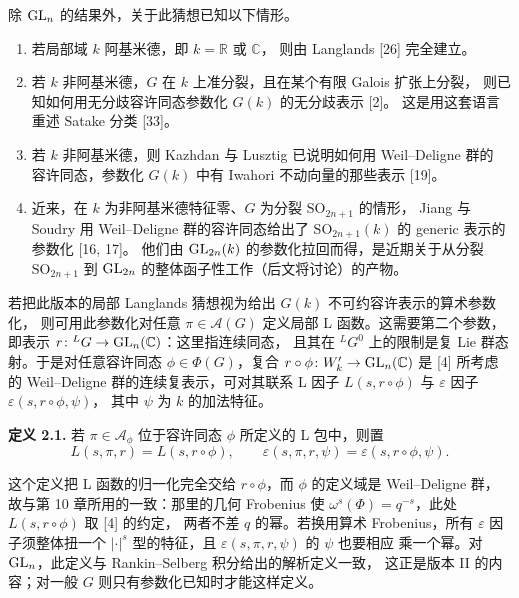 除 $\mathrm{GL}_n$ 的结果外，关于此猜想已知以下情形。
\begin{enumerate}[label=\arabic*.,leftmargin=*]
  \item 若局部域 $k$ 阿基米德，即 $k=\mathbb{R}$ 或 $\mathbb{C}$，
    则由 Langlands [26] 完全建立。
  \item 若 $k$ 非阿基米德，$G$ 在 $k$ 上准分裂，且在某个有限 Galois 扩张上分裂，
    则已知如何用无分歧容许同态参数化 $G(k)$ 的无分歧表示 [2]。
    这是用这套语言重述 Satake 分类 [33]。
  \item 若 $k$ 非阿基米德，则 Kazhdan 与 Lusztig 已说明如何用 Weil--Deligne 群的
    容许同态，参数化 $G(k)$ 中有 Iwahori 不动向量的那些表示 [19]。
  \item 近来，在 $k$ 为非阿基米德特征零、$G$ 为分裂 $\mathrm{SO}_{2n+1}$ 的情形，
    Jiang 与 Soudry 用 Weil--Deligne 群的容许同态给出了
    $\mathrm{SO}_{2n+1}(k)$ 的 generic 表示的参数化 [16, 17]。
    他们由 $\mathrm{GL}_{2n}(k)$ 的参数化拉回而得，是近期关于从分裂
    $\mathrm{SO}_{2n+1}$ 到 $\mathrm{GL}_{2n}$ 的整体函子性工作（后文将讨论）的产物。
\end{enumerate}
若把此版本的局部 Langlands 猜想视为给出 $G(k)$ 不可约容许表示的算术参数化，
则可用此参数化对任意 $\pi\in\mathcal{A}(G)$ 定义局部 L 函数。这需要第二个参数，
即表示 $r\colon{}^{L}G\to\mathrm{GL}_n(\mathbb{C})$：这里指连续同态，
且其在 ${}^{L}G^{0}$ 上的限制是复 Lie 群态射。于是对任意容许同态
$\phi\in\Phi(G)$，复合 $r\circ\phi\colon W'_k\to\mathrm{GL}_n(\mathbb{C})$
是 [4] 所考虑的 Weil--Deligne 群的连续复表示，可对其联系 L 因子
$L(s,r\circ\phi)$ 与 $\varepsilon$ 因子 $\varepsilon(s,r\circ\phi,\psi)$，
其中 $\psi$ 为 $k$ 的加法特征。

\par\medskip\noindent\textbf{定义 2.1.}\quad
若 $\pi\in\mathcal{A}_\phi$ 位于容许同态 $\phi$ 所定义的 L 包中，则置
\[
  L(s,\pi,r)=L(s,r\circ\phi),\qquad
  \varepsilon(s,\pi,r,\psi)=\varepsilon(s,r\circ\phi,\psi).
\]
\begin{annote}
这个定义把 L 函数的归一化完全交给 $r\circ\phi$，而 $\phi$ 的定义域是
Weil--Deligne 群，故与第 10 章所用的一致：那里的几何 Frobenius 使
$\omega^{s}(\Phi)=q^{-s}$，此处 $L(s,r\circ\phi)$ 取 [4] 的约定，
两者不差 $q$ 的幂。若换用算术 Frobenius，所有 $\varepsilon$ 因子须整体扭一个
$|\cdot|^{s}$ 型的特征，且 $\varepsilon(s,\pi,r,\psi)$ 的 $\psi$ 也要相应
乘一个幂。对 $\mathrm{GL}_n$，此定义与 Rankin--Selberg 积分给出的解析定义一致，
这正是版本 II 的内容；对一般 $G$ 则只有参数化已知时才能这样定义。
\par{}
\end{annote}

